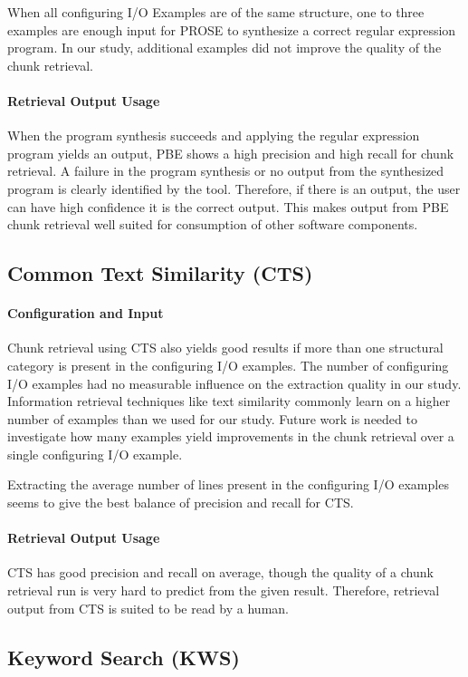 \documentclass[\myrootdir/main.tex]{subfiles}
\begin{document}
When all configuring I/O Examples are of the same structure, one to three examples are enough input for PROSE to synthesize a correct regular expression program.
In our study, additional examples did not improve the quality of the chunk retrieval.

\paragraph{Retrieval Output Usage}
When the program synthesis succeeds and applying the regular expression program yields an output, PBE shows a high precision and high recall for chunk retrieval.
A failure in the program synthesis or no output from the synthesized program is clearly identified by the tool.
Therefore, if there is an output, the user can have high confidence it is the correct output.
This makes output from PBE chunk retrieval well suited for consumption of other software components.

\subsection{Common Text Similarity (CTS)}
\paragraph{Configuration and Input}
Chunk retrieval using CTS also yields good results if more than one structural category is present in the configuring I/O examples.
The number of configuring I/O examples had no measurable influence on the extraction quality in our study.
Information retrieval techniques like text similarity commonly learn on a higher number of examples than we used for our study.
Future work is needed to investigate how many examples yield improvements in the chunk retrieval over a single configuring I/O example.

Extracting the average number of lines present in the configuring I/O examples seems to give the best balance of precision and recall for CTS\@.

\paragraph{Retrieval Output Usage}
CTS has good precision and recall on average, though the quality of a chunk retrieval run is very hard to predict from the given result.
Therefore, retrieval output from CTS is suited to be read by a human.

\subsection{Keyword Search (KWS)}
\end{document}
